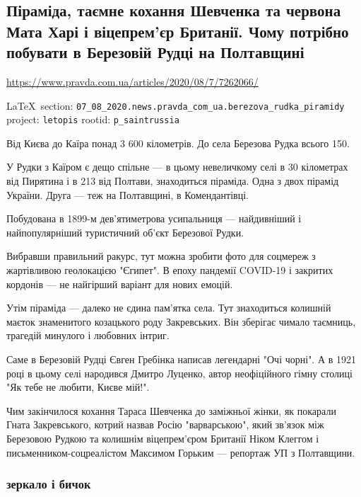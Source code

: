  
 
\subsection{Піраміда, таємне кохання Шевченка та червона Мата Харі і віцепрем'єр Британії. Чому потрібно побувати в Березовій Рудці на Полтавщині}
\label{sec:07_08_2020.news.pravda_com_ua.berezova_rudka_piramidy}
\url{https://www.pravda.com.ua/articles/2020/08/7/7262066/}
  
\vspace{0.5cm}
 {\ifDEBUG\small\LaTeX~section: \verb|07_08_2020.news.pravda_com_ua.berezova_rudka_piramidy| project: \verb|letopis| rootid: \verb|p_saintrussia| \fi}
\vspace{0.5cm}

Від Києва до Каїра понад 3 600 кілометрів. До села Березова Рудка всього 150.

У Рудки з Каїром є дещо спільне --- в цьому невеличкому селі в 30 кілометрах від
Пирятина і в 213 від Полтави, знаходиться піраміда. Одна з двох пірамід
України. Друга --- теж на Полтавщині, в Комендантівці.

Побудована в 1899-м дев'ятиметрова усипальниця --- найдивніший і найпопулярніший
туристичний об'єкт Березової Рудки.

Вибравши правильний ракурс, тут можна зробити фото для соцмереж з жартівливою
геолокацією "Єгипет". В епоху пандемії COVID-19 і закритих кордонів --- не
найгірший варіант для нових емоцій.

Утім піраміда --- далеко не єдина пам'ятка села. Тут знаходиться колишній маєток
знаменитого козацького роду Закревських. Він зберігає чимало таємниць, трагедій
минулого і любовних інтриг.

Саме в Березовій Рудці Євген Гребінка написав легендарні "Очі чорні". А в 1921
році в цьому селі народився Дмитро Луценко, автор неофіційного гімну столиці
"Як тебе не любити, Києве мій!".

Чим закінчилося кохання Тараса Шевченка до заміжньої жінки, як покарали Гната
Закревського, котрий назвав Росію "варварською", який зв'язок між Березовою
Рудкою та колишнім віцепрем'єром Британії Ніком Клеггом і
письменником-соцреалістом Максимом Горьким --- репортаж УП з Полтавщини.

\subsubsection{зеркало і бичок}

